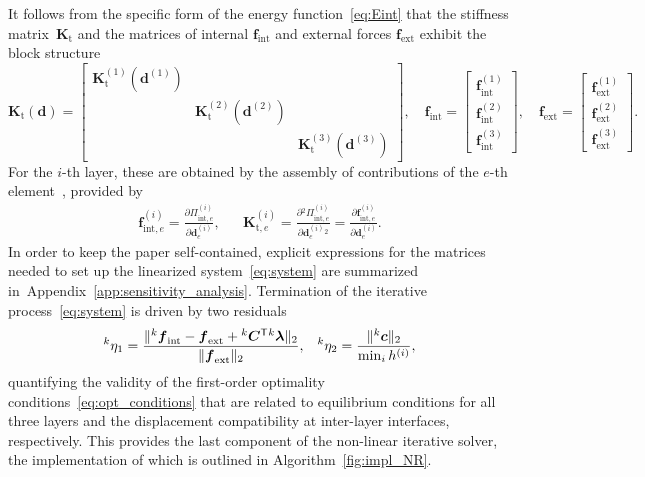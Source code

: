 \documentclass[11pt]{article}
\newcommand{\rev}[1]{#1}
\newcommand{\Aref}[1]{Appendix~\ref{#1}}
\newcommand{\M}[1]{{\boldsymbol #1}}
\newcommand{\lay}[1]{^{(#1)}}
\newcommand{\h}[1]{h\lay{#1}}
\newcommand{\del}[2]{\mbox{$\displaystyle\frac{#1}{#2}$}}
\newcommand{\ppd}[2]{\del{\partial {#1}}{\partial{#2}}}
\newcommand{\Etot}{\Pi}
\newcommand{\Mde}[2]{\Md^{(#1)}_{#2}}
\newcommand{\el}{e}
\newcommand{\trn}{{\sf ^T}}        \newcommand{\eL}[2]{L_{#1}\lay{#2}}
\newcommand{\ite}[1]{{^{#1}}}
\newcommand{\MKt}{\M{K}_\mathrm{t}}
\newcommand{\Mfint}{\M{f}_\mathrm{int}}
\newcommand{\Mfinte}[1]{\M{f}_{\mathrm{int},#1}}
\newcommand{\Mfext}{\M{f}_{\mathrm{ext}}}
\newcommand{\Md}{\M{d}}
\newcommand{\Alref}[1]{Algorithm~\ref{#1}}
\begin{document}
It follows from the specific form of the energy function~\eqref{eq:Eint} that
the stiffness matrix~$\MKt$ and the matrices of internal $\Mfint$ and external
forces $\Mfext$ exhibit the block structure
\begin{equation}\label{eq:matrices_block_diagonal}
\MKt( \Md )
=
\begin{bmatrix}
\MKt\lay{1}( \Md\lay{1} ) \\ 
& 
\MKt\lay{2}( \Md\lay{2} ) \\
&&  
\MKt\lay{3}( \Md\lay{3} )
\end{bmatrix}
, \quad
\Mfint
=
\begin{bmatrix}
 \Mfint\lay{1} \\
 \Mfint\lay{2} \\
 \Mfint\lay{3}
\end{bmatrix}
, \quad
\Mfext
=
\begin{bmatrix}
 \Mfext\lay{1} \\
 \Mfext\lay{2} \\
 \Mfext\lay{3} 
\end{bmatrix}.
\end{equation}
For the $i$-th layer, these are obtained by the assembly of contributions of
the $e$-th element~\cite{Jirasek:2002:IAS}, provided by
\begin{align}\label{eq:internal_forces}
\M{f}_{\mathrm{int},e}\lay{i}
=
\ppd{\Etot_{\mathrm{int},e}\lay{i}}{\Mde{i}{\el}}, 
&&
\M{K}_{\mathrm t,e}\lay{i} 
=
\ppd{^2\Etot_{\mathrm{int},e}\lay{i}}{\Mde{i}{\el}{}^2} 
=
\ppd{\Mfinte{\el}\lay{i}}{\Mde{i}{\el}}.
\end{align} 
In order to keep the paper self-contained, explicit expressions for the matrices
needed to set up the linearized system~\eqref{eq:system} are summarized
in~\Aref{app:sensitivity_analysis}. Termination of the iterative
process~\eqref{eq:system} is driven by two
residuals~\cite[Section~14.1]{Bonnans:2003:NOTPA}
\begin{align}\label{eq:residuals}
\ite{k}\eta_1 
= 
\frac{\| \ite{k}\Mfint - \Mfext + \ite{k}\M{C}\trn
\ite{k}\M{\lambda} \|_2
}{\| \Mfext \|_2
},
&&
\ite{k}\eta_2 
= 
\frac{\| \ite{k} \M{c} \|_2
}{\min_{i} \h{i}
}, 
\end{align}
quantifying the validity of the first-order optimality
conditions~\eqref{eq:opt_conditions} \rev{that are related to equilibrium
conditions for all three layers and the displacement compatibility at
inter-layer interfaces, respectively.} This provides the last component of the
non-linear iterative solver, the implementation of which is outlined in
\Alref{fig:impl_NR}.
\end{document}
